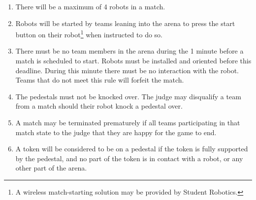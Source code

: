 \begin{enumerate}
\item There will be a maximum of 4 robots in a match.
\item Robots will be started by teams leaning into the arena to press the start button on their robot\footnote{A wireless match-starting solution may be provided by Student Robotics.} when instructed to do so.

\item There must be no team members in the arena during the 1 minute before a match is scheduled to start.
      Robots must be installed and oriented before this deadline.
      During this minute there must be no interaction with the robot.
      Teams that do not meet this rule will forfeit the match.

\item The pedestals must not be knocked over.
      The judge may disqualify a team from a match should their robot knock a pedestal over.

\item A match may be terminated prematurely if all teams participating in that match state to the judge that they are happy for the game to end.

\item A token will be considered to be on a pedestal if the token is fully supported by the pedestal, and no part of the token is in contact with a robot, or any other part of the arena.

\end{enumerate}
